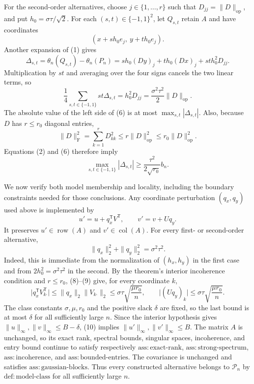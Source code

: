 For the second-order alternatives, choose \(j\in\{1,\ldots,r\}\) such that \(D_{jj}=\|D\|_{\mathrm{op}}\), and put \(h_0=\sigma\tau/\sqrt2\).  For each \((s,t)\in\{-1,1\}^2\), let \(Q_{s,t}\) retain \(A\) and have coordinates
\[
(x+s h_0e_j,\ y+t h_0e_j).
\]
Another expansion of (1) gives
\[
\Delta_{s,t}
=\theta_n(Q_{s,t})-\theta_n(P_n)
=s h_0(Dy)_j+t h_0(Dx)_j+st h_0^2D_{jj}. \tag{5}
\]
Multiplication by \(st\) and averaging over the four signs cancels the two linear terms, so
\[
\frac14\sum_{s,t\in\{-1,1\}}st\Delta_{s,t}
=h_0^2D_{jj}
=\frac{\sigma^2\tau^2}{2}\|D\|_{\mathrm{op}}. \tag{6}
\]
The absolute value of the left side of (6) is at most \(\max_{s,t}|\Delta_{s,t}|\).  Also, because \(D\) has \(r\leq r_0\) diagonal entries,
\[
\|D\|_{\mathrm F}^2=\sum_{k=1}^rD_{kk}^2
\leq r\|D\|_{\mathrm{op}}^2
\leq r_0\|D\|_{\mathrm{op}}^2.
\]
Equations (2) and (6) therefore imply
\[
\max_{s,t\in\{-1,1\}}|\Delta_{s,t}|
\geq\frac{\tau^2}{2\sqrt{r_0}}b_n. \tag{7}
\]

We now verify both model membership and locality, including the boundary constraints needed for those conclusions.  Any coordinate perturbation \((q_x,q_y)\) used above is implemented by
\[
u'=u+q_x^{\mathsf T}V^{\mathsf T},
\qquad
v'=v+Uq_y. \tag{8}
\]
It preserves \(u'\in\operatorname{row}(A)\) and \(v'\in\operatorname{col}(A)\).  For every first- or second-order alternative,
\[
\|q_x\|_2^2+\|q_y\|_2^2=\sigma^2\tau^2. \tag{9}
\]
Indeed, this is immediate from the normalization of \((h_x,h_y)\) in the first case and from \(2h_0^2=\sigma^2\tau^2\) in the second.  By the theorem's interior incoherence condition and \(r\leq r_0\), (8)--(9) give, for every coordinate \(k\),
\[
\bigl|q_x^{\mathsf T}V_{k\mathbin{\boldsymbol\cdot}}^{\mathsf T}\bigr|
\leq\|q_x\|_2\|V_{k\mathbin{\boldsymbol\cdot}}\|_2
\leq\sigma\tau\sqrt{\frac{\mu r_0}{n}},
\qquad
\bigl|(Uq_y)_k\bigr|
\leq\sigma\tau\sqrt{\frac{\mu r_0}{n}}. \tag{10}
\]
The class constants \(\sigma,\mu,r_0\) and the positive slack \(\delta\) are fixed, so the last bound is at most \(\delta\) for all sufficiently large \(n\).  Since the interior hypothesis gives \(\|u\|_\infty,\|v\|_\infty\leq B-\delta\), (10) implies \(\|u'\|_\infty,\|v'\|_\infty\leq B\).  The matrix \(A\) is unchanged, so its exact rank, spectral bounds, singular spaces, incoherence, and entry bound continue to satisfy respectively \(\mathrm{ass{:}exact\mbox{-}rank}\), \(\mathrm{ass{:}strong\mbox{-}spectrum}\), \(\mathrm{ass{:}incoherence}\), and \(\mathrm{ass{:}bounded\mbox{-}entries}\).  The covariance is unchanged and satisfies \(\mathrm{ass{:}gaussian\mbox{-}blocks}\).  Thus every constructed alternative belongs to \(\mathcal P_n\) by \(\mathrm{def{:}model\mbox{-}class}\) for all sufficiently large \(n\).

